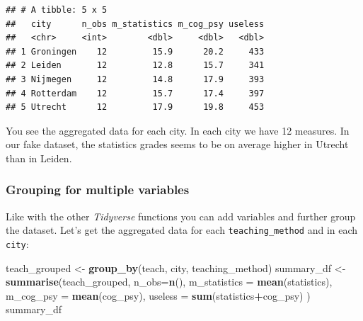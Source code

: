 \documentclass[
]{scrartcl}
\newenvironment{Shaded}{\begin{snugshade}}{\end{snugshade}}
\newcommand{\AttributeTok}[1]{\textcolor[rgb]{0.13,0.29,0.53}{#1}}
\newcommand{\FunctionTok}[1]{\textcolor[rgb]{0.13,0.29,0.53}{\textbf{#1}}}
\newcommand{\NormalTok}[1]{#1}
\newcommand{\OtherTok}[1]{\textcolor[rgb]{0.56,0.35,0.01}{#1}}
\newcommand{\SpecialCharTok}[1]{\textcolor[rgb]{0.81,0.36,0.00}{\textbf{#1}}}
\begin{document}
\begin{verbatim}
## # A tibble: 5 x 5
##   city      n_obs m_statistics m_cog_psy useless
##   <chr>     <int>        <dbl>     <dbl>   <dbl>
## 1 Groningen    12         15.9      20.2     433
## 2 Leiden       12         12.8      15.7     341
## 3 Nijmegen     12         14.8      17.9     393
## 4 Rotterdam    12         15.7      17.4     397
## 5 Utrecht      12         17.9      19.8     453
\end{verbatim}

You see the aggregated data for each city. In each city we have 12 measures. In our fake dataset, the statistics grades seems to be on average higher in Utrecht than in Leiden.

\subsubsection*{Grouping for multiple variables}\label{grouping-for-multiple-variables}

Like with the other \emph{Tidyverse} functions you can add variables and further group the dataset. Let's get the aggregated data for each \texttt{teaching\_method} and in each \texttt{city}:

\begin{Shaded}
\begin{Highlighting}[]
\NormalTok{teach\_grouped }\OtherTok{\textless{}{-}} \FunctionTok{group\_by}\NormalTok{(teach, city, teaching\_method)}
\NormalTok{summary\_df }\OtherTok{\textless{}{-}} \FunctionTok{summarise}\NormalTok{(teach\_grouped,}
                \AttributeTok{n\_obs=}\FunctionTok{n}\NormalTok{(),}
                \AttributeTok{m\_statistics =} \FunctionTok{mean}\NormalTok{(statistics),}
                \AttributeTok{m\_cog\_psy =} \FunctionTok{mean}\NormalTok{(cog\_psy),}
                \AttributeTok{useless =} \FunctionTok{sum}\NormalTok{(statistics}\SpecialCharTok{+}\NormalTok{cog\_psy) )}
\NormalTok{summary\_df}
\end{Highlighting}
\end{Shaded}
\end{document}
